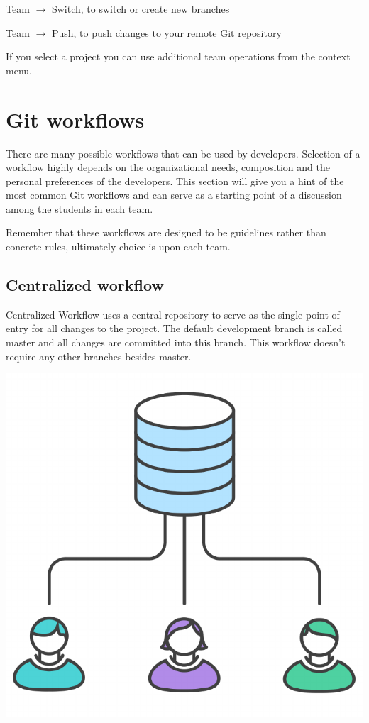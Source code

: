 \documentclass{article}
\begin{document}
Team $\rightarrow$ Switch, to switch or create new branches

Team $\rightarrow$ Push, to push changes to your remote Git repository

If you select a project you can use additional team operations from
the context menu.



\newpage

\section{Git workflows}

There are many possible workflows that can be used by
developers. Selection of a workflow highly depends on the
organizational needs, composition and the personal preferences of the
developers. This section will give you a hint of the most common Git
workflows and can serve as a starting point of a discussion among
the students in each team.  

Remember that these workflows are designed to be guidelines rather
than concrete rules, ultimately choice is upon each team.

\subsection{Centralized workflow}

Centralized Workflow uses a central repository to serve as the single
point-of-entry for all changes to the project. The
default development branch is called master and all changes are
committed into this branch. This workflow doesn't require any other
branches besides master. 

\begin{center}
\includegraphics[scale=0.5]{figures/12.pdf}
\end{center}
\end{document}

